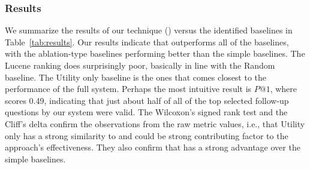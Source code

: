 \subsubsection{Results}
We summarize the results of our technique (\evpi) versus the identified
baselines in Table~\ref{tab:results}. Our results indicate that \evpi outperforms all of the baselines,
with the ablation-type baselines performing better than the simple baselines. The Lucene ranking
does surprisingly poor, basically in line with the Random baseline. The Utility only baseline is
the ones that comes closest to the performance of the full system. Perhaps the most intuitive result
is $P@1$, where \evpi scores 0.49, indicating that just about half of all of the top selected follow-up
questions by our system were valid. The Wilcoxon's signed rank test and the Cliff's delta confirm the observations from
the raw metric values, i.e., that Utility only has a strong similarity to \evpi and could be strong contributing
factor to the approach's effectiveness. They also confirm that \evpi has a strong advantage over the simple
baselines.

